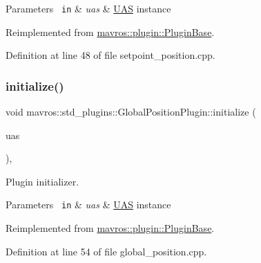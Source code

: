 \begin{DoxyParams}[1]{Parameters}
\mbox{\texttt{ in}}  & {\em uas} & {\ttfamily \mbox{\hyperlink{classmavros_1_1UAS}{U\+AS}}} instance \\
\hline
\end{DoxyParams}


Reimplemented from \mbox{\hyperlink{group__plugin_gad5313a41da4d26acbbabf008cdc21e82}{mavros\+::plugin\+::\+Plugin\+Base}}.



Definition at line 48 of file setpoint\+\_\+position.\+cpp.

\mbox{\label{group__plugin_ga41dceb095bbd1b8b99c46c9a277bb7a9}} 
\subsubsection{\texorpdfstring{initialize()}{initialize()}\hspace{0.1cm}{\footnotesize\ttfamily [30/41]}}
{\footnotesize\ttfamily void mavros\+::std\+\_\+plugins\+::\+Global\+Position\+Plugin\+::initialize (\begin{DoxyParamCaption}\item[{\mbox{\hyperlink{classmavros_1_1UAS}{U\+AS}} \&}]{uas }\end{DoxyParamCaption})\hspace{0.3cm}{\ttfamily [inline]}, {\ttfamily [virtual]}}



Plugin initializer. 


\begin{DoxyParams}[1]{Parameters}
\mbox{\texttt{ in}}  & {\em uas} & {\ttfamily \mbox{\hyperlink{classmavros_1_1UAS}{U\+AS}}} instance \\
\hline
\end{DoxyParams}


Reimplemented from \mbox{\hyperlink{group__plugin_gad5313a41da4d26acbbabf008cdc21e82}{mavros\+::plugin\+::\+Plugin\+Base}}.



Definition at line 54 of file global\+\_\+position.\+cpp.

\mbox{\label{group__plugin_ga99901f90ec1683567962b8d131efe84e}} 
